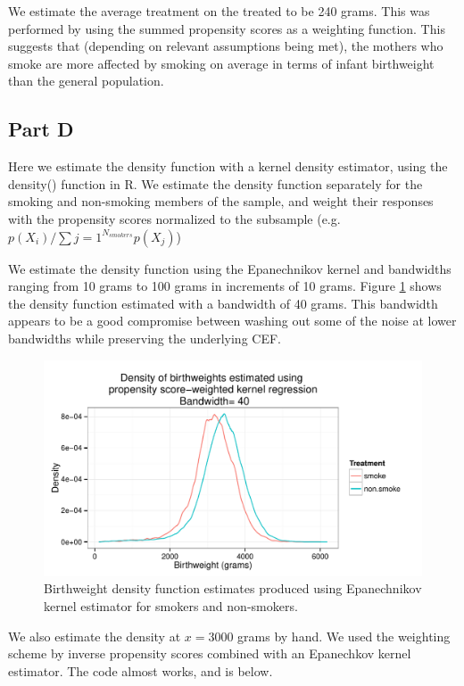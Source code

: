 \documentclass[letterpaper, 12pt]{article}
\begin{document}
We estimate the average treatment on the treated to be 240 grams. This was performed by using the summed propensity scores as a weighting function. This suggests that (depending on relevant assumptions being met), the mothers who smoke are more affected by smoking on average in terms of infant birthweight than the general population.

\subsection{Part D}
Here we estimate the density function with a kernel density estimator, using the density() function in R. We estimate the density function separately for the smoking and non-smoking members of the sample, and weight their responses with the propensity scores normalized to the subsample (e.g. $p(X_i)/\sum\limits{j=1}^{N_{smokers}}p(X_j)$)

We estimate the density function using the Epanechnikov kernel and bandwidths ranging from 10 grams to 100 grams in increments of 10 grams. Figure \ref{fig:kernel40} shows the density function estimated with a bandwidth of 40 grams. This bandwidth appears to be a good compromise between washing out some of the noise at lower bandwidths while preserving the underlying CEF. 

\begin{figure}[h!]
   \centering
   \includegraphics[width=6in]{img/kerndensity40.pdf} 
   \caption{Birthweight density function estimates produced using Epanechnikov kernel estimator for smokers and non-smokers.}
   \label{fig:kernel40}
\end{figure}

We also estimate the density at $x=3000$ grams by hand. We used the weighting scheme by inverse propensity scores combined with an Epanechkov kernel estimator.  The code almost works, and is below.
\end{document}
